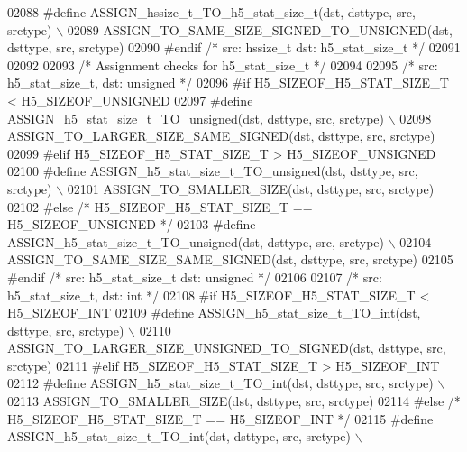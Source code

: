 \begin{DoxyCode}
02088 \textcolor{preprocessor}{    #define ASSIGN\_hssize\_t\_TO\_h5\_stat\_size\_t(dst, dsttype, src, srctype) \(\backslash\)}
02089 \textcolor{preprocessor}{        ASSIGN\_TO\_SAME\_SIZE\_SIGNED\_TO\_UNSIGNED(dst, dsttype, src, srctype)}
02090 \textcolor{preprocessor}{#endif }\textcolor{comment}{/* src: hssize\_t dst: h5\_stat\_size\_t */}\textcolor{preprocessor}{}
02091 
02092 
02093 \textcolor{comment}{/* Assignment checks for h5\_stat\_size\_t */}
02094 
02095 \textcolor{comment}{/* src: h5\_stat\_size\_t, dst: unsigned */}
02096 \textcolor{preprocessor}{#if H5\_SIZEOF\_H5\_STAT\_SIZE\_T < H5\_SIZEOF\_UNSIGNED}
02097 \textcolor{preprocessor}{    #define ASSIGN\_h5\_stat\_size\_t\_TO\_unsigned(dst, dsttype, src, srctype) \(\backslash\)}
02098 \textcolor{preprocessor}{        ASSIGN\_TO\_LARGER\_SIZE\_SAME\_SIGNED(dst, dsttype, src, srctype)}
02099 \textcolor{preprocessor}{#elif H5\_SIZEOF\_H5\_STAT\_SIZE\_T > H5\_SIZEOF\_UNSIGNED}
02100 \textcolor{preprocessor}{    #define ASSIGN\_h5\_stat\_size\_t\_TO\_unsigned(dst, dsttype, src, srctype) \(\backslash\)}
02101 \textcolor{preprocessor}{        ASSIGN\_TO\_SMALLER\_SIZE(dst, dsttype, src, srctype)}
02102 \textcolor{preprocessor}{#else }\textcolor{comment}{/* H5\_SIZEOF\_H5\_STAT\_SIZE\_T == H5\_SIZEOF\_UNSIGNED */}\textcolor{preprocessor}{}
02103 \textcolor{preprocessor}{    #define ASSIGN\_h5\_stat\_size\_t\_TO\_unsigned(dst, dsttype, src, srctype) \(\backslash\)}
02104 \textcolor{preprocessor}{        ASSIGN\_TO\_SAME\_SIZE\_SAME\_SIGNED(dst, dsttype, src, srctype)}
02105 \textcolor{preprocessor}{#endif }\textcolor{comment}{/* src: h5\_stat\_size\_t dst: unsigned */}\textcolor{preprocessor}{}
02106 
02107 \textcolor{comment}{/* src: h5\_stat\_size\_t, dst: int */}
02108 \textcolor{preprocessor}{#if H5\_SIZEOF\_H5\_STAT\_SIZE\_T < H5\_SIZEOF\_INT}
02109 \textcolor{preprocessor}{    #define ASSIGN\_h5\_stat\_size\_t\_TO\_int(dst, dsttype, src, srctype) \(\backslash\)}
02110 \textcolor{preprocessor}{        ASSIGN\_TO\_LARGER\_SIZE\_UNSIGNED\_TO\_SIGNED(dst, dsttype, src, srctype)}
02111 \textcolor{preprocessor}{#elif H5\_SIZEOF\_H5\_STAT\_SIZE\_T > H5\_SIZEOF\_INT}
02112 \textcolor{preprocessor}{    #define ASSIGN\_h5\_stat\_size\_t\_TO\_int(dst, dsttype, src, srctype) \(\backslash\)}
02113 \textcolor{preprocessor}{        ASSIGN\_TO\_SMALLER\_SIZE(dst, dsttype, src, srctype)}
02114 \textcolor{preprocessor}{#else }\textcolor{comment}{/* H5\_SIZEOF\_H5\_STAT\_SIZE\_T == H5\_SIZEOF\_INT */}\textcolor{preprocessor}{}
02115 \textcolor{preprocessor}{    #define ASSIGN\_h5\_stat\_size\_t\_TO\_int(dst, dsttype, src, srctype) \(\backslash\)}

\end{DoxyCode}
